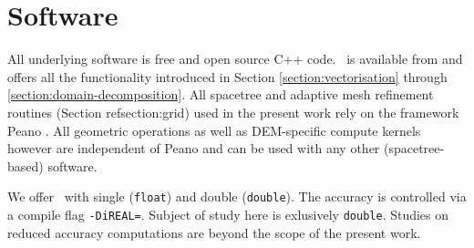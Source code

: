 \section{Software}
\label{section:software}

All underlying software is free and open source C++ code.
\DeltaSoftware\ is available from \cite{Software:Delta} and offers all the
functionality introduced in Section \ref{section:vectorisation} through
\ref{section:domain-decomposition}.
All spacetree and adaptive mesh refinement routines (Section ref{section:grid}) used in the
present work rely on the framework Peano
\cite{Software:Peano,Weinzierl:2009:Diss,Weinzierl:11:Peano}.
All geometric operations as well as DEM-specific compute kernels however are
independent of Peano and can be used with any other (spacetree-based) software.

We offer \DeltaSoftware\ with single (\texttt{float}) and double
(\texttt{double}).
The accuracy is controlled via a compile flag \texttt{-DiREAL=}.
Subject of study here is exlusively \texttt{double}. 
Studies on reduced accuracy computations are beyond the scope of the present
work.

